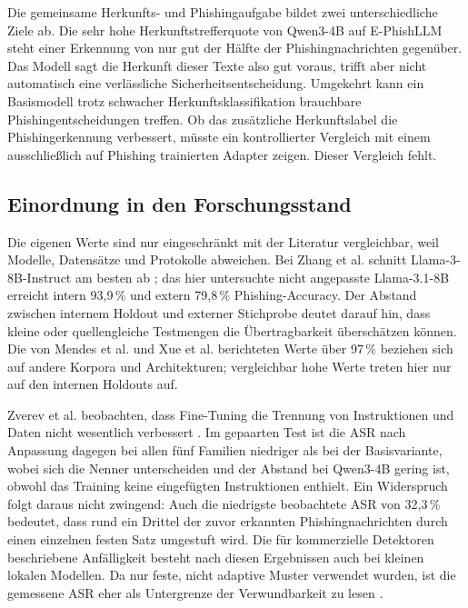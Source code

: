 \documentclass[12pt,twoside=false,a4paper,parskip]{scrbook}
\begin{document}
Die gemeinsame Herkunfts- und Phishingaufgabe bildet zwei unterschiedliche Ziele ab. Die sehr hohe Herkunftstrefferquote von Qwen3-4B auf E-PhishLLM steht einer Erkennung von nur gut der Hälfte der Phishingnachrichten gegenüber. Das Modell sagt die Herkunft dieser Texte also gut voraus, trifft aber nicht automatisch eine verlässliche Sicherheitsentscheidung. Umgekehrt kann ein Basismodell trotz schwacher Herkunftsklassifikation brauchbare Phishingentscheidungen treffen. Ob das zusätzliche Herkunftslabel die Phishingerkennung verbessert, müsste ein kontrollierter Vergleich mit einem ausschließlich auf Phishing trainierten Adapter zeigen. Dieser Vergleich fehlt.

\subsection{Einordnung in den Forschungsstand}\label{sec:einordnung-literatur}

Die eigenen Werte sind nur eingeschränkt mit der Literatur vergleichbar, weil Modelle, Datensätze und Protokolle abweichen. Bei Zhang et al. schnitt Llama-3-8B-Instruct am besten ab \cite{zhang2025benchmarking}; das hier untersuchte nicht angepasste Llama-3.1-8B erreicht intern 93{,}9\,\% und extern 79{,}8\,\% Phishing-Accuracy. Der Abstand zwischen internem Holdout und externer Stichprobe deutet darauf hin, dass kleine oder quellengleiche Testmengen die Übertragbarkeit überschätzen können. Die von Mendes et al. und Xue et al. berichteten Werte über 97\,\% \cite{mendes2025meajor,xue2025multiphishguard} beziehen sich auf andere Korpora und Architekturen; vergleichbar hohe Werte treten hier nur auf den internen Holdouts auf.

Zverev et al. beobachten, dass Fine-Tuning die Trennung von Instruktionen und Daten nicht wesentlich verbessert \cite{zverev2025separate}. Im gepaarten Test ist die ASR nach Anpassung dagegen bei allen fünf Familien niedriger als bei der Basisvariante, wobei sich die Nenner unterscheiden und der Abstand bei Qwen3-4B gering ist, obwohl das Training keine eingefügten Instruktionen enthielt. Ein Widerspruch folgt daraus nicht zwingend: Auch die niedrigste beobachtete ASR von 32{,}3\,\% bedeutet, dass rund ein Drittel der zuvor erkannten Phishingnachrichten durch einen einzelnen festen Satz umgestuft wird. Die für kommerzielle Detektoren beschriebene Anfälligkeit \cite{hasan2025phishing} besteht nach diesen Ergebnissen auch bei kleinen lokalen Modellen. Da nur feste, nicht adaptive Muster verwendet wurden, ist die gemessene ASR eher als Untergrenze der Verwundbarkeit zu lesen \cite{nasr2025attacker}.
\end{document}
